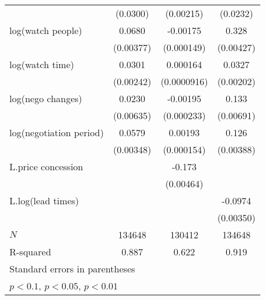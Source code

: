 {\begin{tabular}{l*{3}{c}}
            &    (0.0300)         &   (0.00215)         &    (0.0232)         \\
\addlinespace
log(watch people)&      0.0680\sym{***}&    -0.00175\sym{***}&       0.328\sym{***}\\
            &   (0.00377)         &  (0.000149)         &   (0.00427)         \\
\addlinespace
log(watch time)&      0.0301\sym{***}&    0.000164\sym{*}  &      0.0327\sym{***}\\
            &   (0.00242)         & (0.0000916)         &   (0.00202)         \\
\addlinespace
log(nego changes)&      0.0230\sym{***}&    -0.00195\sym{***}&       0.133\sym{***}\\
            &   (0.00635)         &  (0.000233)         &   (0.00691)         \\
\addlinespace
log(negotiation period)&      0.0579\sym{***}&     0.00193\sym{***}&       0.126\sym{***}\\
            &   (0.00348)         &  (0.000154)         &   (0.00388)         \\
\addlinespace
L.price concession&                     &      -0.173\sym{***}&                     \\
            &                     &   (0.00464)         &                     \\
\addlinespace
L.log(lead times)   &                     &                     &     -0.0974\sym{***}\\
            &                     &                     &   (0.00350)         \\
\midrule
\(N\)       &      134648         &      130412         &      134648         \\
R-squared   &       0.887         &       0.622         &       0.919         \\
\bottomrule
\multicolumn{4}{l}{\footnotesize Standard errors in parentheses}\\
\multicolumn{4}{l}{\footnotesize \sym{*} \(p<0.1\), \sym{**} \(p<0.05\), \sym{***} \(p<0.01\)}\\
\end{tabular}
}

